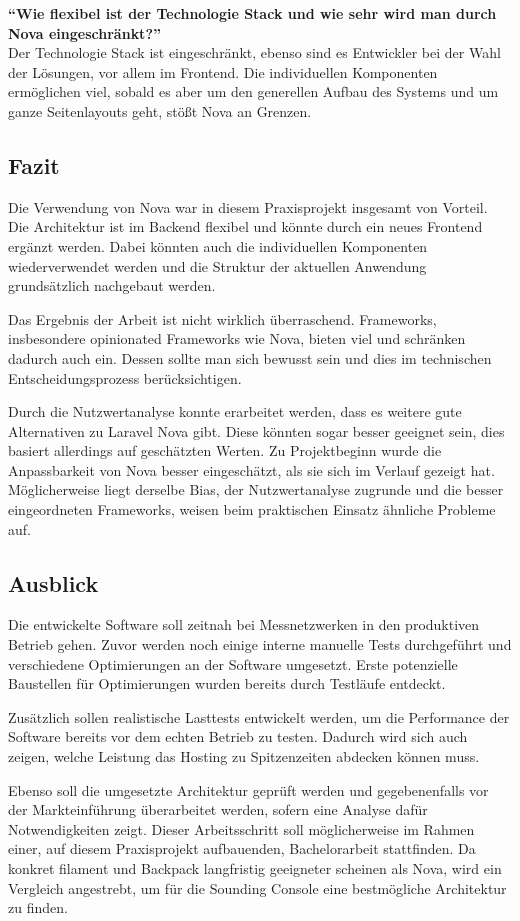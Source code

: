 \textbf{\enquote{Wie flexibel ist der Technologie Stack und wie sehr wird man durch Nova eingeschränkt?}}\\
Der Technologie Stack ist eingeschränkt, ebenso sind es Entwickler bei der Wahl der Lösungen, vor allem im Frontend.
Die individuellen Komponenten ermöglichen viel, sobald es aber um den generellen Aufbau des Systems und um ganze Seitenlayouts geht, stößt Nova an Grenzen.

\subsection{Fazit}
Die Verwendung von Nova war in diesem Praxisprojekt insgesamt von Vorteil.
Die Architektur ist im Backend flexibel und könnte durch ein neues Frontend ergänzt werden.
Dabei könnten auch die individuellen Komponenten wiederverwendet werden und die Struktur der aktuellen Anwendung grundsätzlich nachgebaut werden.

Das Ergebnis der Arbeit ist nicht wirklich überraschend.
Frameworks, insbesondere opinionated Frameworks wie Nova, bieten viel und schränken dadurch auch ein.
Dessen sollte man sich bewusst sein und dies im technischen Entscheidungsprozess berücksichtigen.

Durch die Nutzwertanalyse konnte erarbeitet werden, dass es weitere gute Alternativen zu Laravel Nova gibt.
Diese könnten sogar besser geeignet sein, dies basiert allerdings auf geschätzten Werten.
Zu Projektbeginn wurde die Anpassbarkeit von Nova besser eingeschätzt, als sie sich im Verlauf gezeigt hat.
Möglicherweise liegt derselbe Bias, der Nutzwertanalyse zugrunde und die besser eingeordneten Frameworks, weisen beim praktischen Einsatz ähnliche Probleme auf.

\subsection{Ausblick}
Die entwickelte Software soll zeitnah bei Messnetzwerken in den produktiven Betrieb gehen.
Zuvor werden noch einige interne manuelle Tests durchgeführt und verschiedene Optimierungen an der Software umgesetzt.
Erste potenzielle Baustellen für Optimierungen wurden bereits durch Testläufe entdeckt.

Zusätzlich sollen realistische Lasttests entwickelt werden, um die Performance der Software bereits vor dem echten Betrieb zu testen.
Dadurch wird sich auch zeigen, welche Leistung das Hosting zu Spitzenzeiten abdecken können muss.

Ebenso soll die umgesetzte Architektur geprüft werden und gegebenenfalls vor der Markteinführung überarbeitet werden, sofern eine Analyse dafür Notwendigkeiten zeigt.
Dieser Arbeitsschritt soll möglicherweise im Rahmen einer, auf diesem Praxisprojekt aufbauenden, Bachelorarbeit stattfinden.
Da konkret filament und Backpack langfristig geeigneter scheinen als Nova, wird ein Vergleich angestrebt, um für die Sounding Console eine bestmögliche Architektur zu finden.
